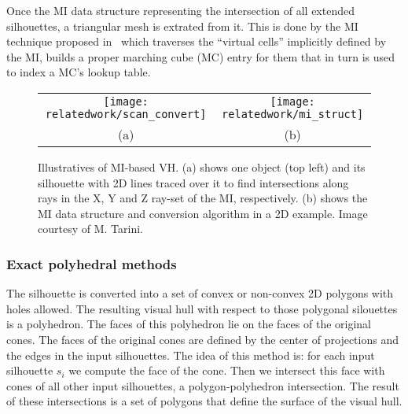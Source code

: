 Once the MI data structure representing the intersection of all extended silhouettes, a triangular mesh is extrated from it. This is done by the MI technique proposed in~\cite{rocchini2001marching} which traverses the ``virtual cells'' implicitly defined by the MI, builds a proper marching cube (MC) entry for them that in turn is used to index a MC's lookup table.

\begin{figure}[h]
\centering
\begin{tabular}{cc}
\texttt{[image: relatedwork/scan\_convert]}&
\texttt{[image: relatedwork/mi\_struct]}\\
(a) & (b)\\
\end{tabular}
\caption{Illustratives of MI-based VH. (a) shows one object (top left) and its silhouette with 2D lines traced over it to find intersections along rays in the X, Y and Z ray-set of the MI, respectively. (b) shows the MI data structure and conversion algorithm in a 2D example. Image courtesy of M. Tarini.}
\label{fig:robust_pc}
\end{figure}

\subsubsection{Exact polyhedral methods}
The silhouette is converted into a set of convex or non-convex 2D polygons with holes allowed. The resulting visual hull with respect to those polygonal silouettes is a polyhedron. The faces of this polyhedron lie on the faces of the original cones. The faces of the original cones are defined by the center of projections and the edges in the input silhouettes. The idea of this method is: for each input silhouette $s_i$ we compute the face of the cone. Then we intersect this face with cones of all other input silhouettes, \ie a polygon-polyhedron intersection. The result of these intersections is a set of polygons that define the surface of the visual hull.


